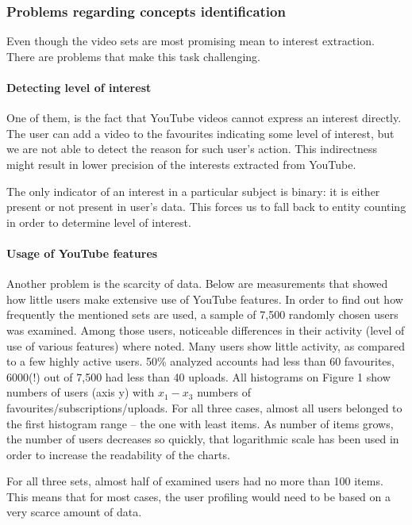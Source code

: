 \subsubsection{Problems regarding concepts identification}

Even though the video sets are most promising mean to interest extraction. There
are problems that make this task challenging.

\paragraph{Detecting level of interest}
One of them, is the fact that YouTube videos cannot
express an interest directly. The user can add a video to the favourites
indicating some level of interest, but we are not able to detect the reason for
such user's action. This indirectness might result in lower precision of the
interests extracted from YouTube. 

The only indicator of an interest in a particular subject is binary: it is
either present or not present in user's data. This forces us to fall back to
entity counting in order to determine level of interest.

\paragraph{Usage of YouTube features} 
Another problem is the scarcity of data. Below are measurements that showed how
little users make extensive use of YouTube features.
In order to find out how frequently the
mentioned sets are used, a sample of 7,500 randomly chosen users was examined.
Among those users, noticeable differences in their activity (level of use of
various features) where noted. Many users show little activity, as compared to a
few highly active users.  50\% analyzed accounts had less than 60 favourites,
6000(!) out of 7,500 had less than 40 uploads.  All histograms on Figure 1 show
numbers of users (axis y) with $x_1-x_3$ numbers of
favourites/subscriptions/uploads. For all three cases, almost all users belonged
to the first histogram range -- the one with least items. As number of items
grows, the number of users decreases so quickly, that logarithmic scale has been
used in order to increase the readability of the charts.

For all three sets, almost half of examined users had no more than 100 items.
This means that for most cases, the user profiling would need to be based on a very
scarce amount of data.

